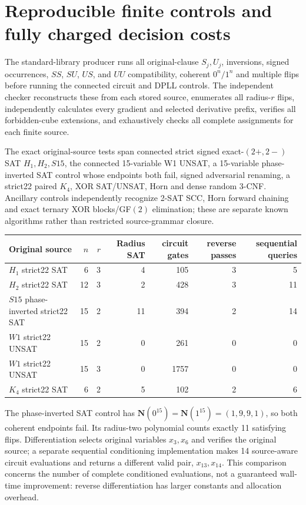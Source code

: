 \documentclass[11pt]{article}
\newcommand{\NN}{\mathbf N}
\begin{document}
\section{Reproducible finite controls and fully charged decision costs}
The standard-library producer runs all original-clause $S_j,U_j$, inversions, signed occurrences, $SS$, $SU$, $US$, and $UU$ compatibility, coherent $0^n/1^n$ and multiple flips before running the connected circuit and DPLL controls. The independent checker reconstructs these from each stored source, enumerates all radius-$r$ flips, independently calculates every gradient and selected derivative prefix, verifies all forbidden-cube extensions, and exhaustively checks all complete assignments for each finite source.

The exact original-source tests span connected strict signed exact-$(2+,2-)$ SAT $H_1,H_2,S15$, the connected 15-variable W1 UNSAT, a 15-variable phase-inverted SAT control whose endpoints both fail, signed adversarial renaming, a strict22 paired $K_4$, XOR SAT/UNSAT, Horn and dense random 3-CNF. Ancillary controls independently recognize 2-SAT SCC, Horn forward chaining and exact ternary XOR blocks/GF$(2)$ elimination; these are separate known algorithms rather than restricted source-grammar closure.

\begin{center}\small
\begin{tabular}{lrrrrrr}
\toprule
Original source & $n$ & $r$ & Radius SAT & circuit gates & reverse passes & sequential queries\\
\midrule
$H_1$ strict22 SAT &6&3&4&105&3&5\\
$H_2$ strict22 SAT &12&3&2&428&3&11\\
$S15$ phase-inverted strict22 SAT &15&2&11&394&2&14\\
$W1$ strict22 UNSAT &15&2&0&261&0&0\\
$W1$ strict22 UNSAT &15&3&0&1757&0&0\\
$K_4$ strict22 SAT &6&2&5&102&2&6\\
\bottomrule
\end{tabular}
\end{center}
The phase-inverted SAT control has $\NN(0^{15})=\NN(1^{15})=(1,9,9,1)$, so both coherent endpoints fail. Its radius-two polynomial counts exactly 11 satisfying flips. Differentiation selects original variables $x_3,x_6$ and verifies the original source; a separate sequential conditioning implementation makes 14 source-aware circuit evaluations and returns a different valid pair, $x_{13},x_{14}$. This comparison concerns the number of complete conditioned evaluations, not a guaranteed wall-time improvement: reverse differentiation has larger constants and allocation overhead.
\end{document}
